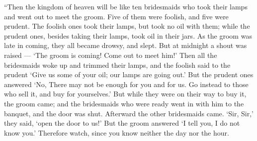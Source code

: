  ``Then the kingdom of heaven will be like ten bridesmaids
who took their lamps and went out to meet the groom.  Five
of them were foolish, and five were prudent.  The foolish
ones took their lamps, but took no oil with them;  while the
prudent ones, besides taking their lamps, took oil in their jars.
 As the groom was late in coming, they all became drowsy,
and slept.  But at midnight a shout was raised --- `The
groom is coming! Come out to meet him!'  Then all the
bridesmaids woke up and trimmed their lamps,  and the
foolish said to the prudent `Give us some of your oil; our lamps are
going out.'  But the prudent ones answered `No, There may
not be enough for you and for us. Go instead to those who sell it, and
buy for yourselves.'  But while they were on their way to
buy it, the groom came; and the bridesmaids who were ready went in with
him to the banquet, and the door was shut.  Afterward the
other bridesmaids came. `Sir, Sir,' they said, `open the door to us!'
 But the groom answered `I tell you, I do not know you.'
 Therefore watch, since you know neither the day nor the
hour.

